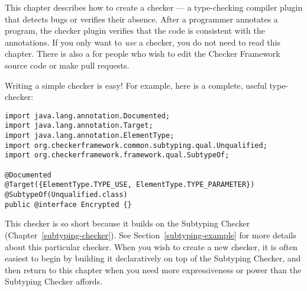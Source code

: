 \htmlhr
{}
\label{writing-a-checker} %

\newcommand{\TreeAPIBase}{https://docs.oracle.com/en/java/javase/11/docs/api/jdk.compiler/com/sun/source}
\newcommand{\refTreeclass}[2]{\href{\TreeAPIBase{}/#1/#2.html?is-external=true}{\<#2>}}
\newcommand{\ModelAPIBase}{https://docs.oracle.com/en/java/javase/11/docs/api/java.compiler/javax/lang/model}
\newcommand{\refModelclass}[2]{\href{\ModelAPIBase{}/#1/#2.html?is-external=true}{\<#2>}}

This chapter describes how to create a checker
--- a type-checking compiler plugin that detects bugs or verifies their
absence.  After a programmer annotates a program,
the checker plugin verifies that the code is consistent
with the annotations.
If you only want to \emph{use} a checker, you do not need to read this
chapter.
There is also a
 for people who wish to edit the Checker Framework source code or
make pull requests.


Writing a simple checker is easy!  For example, here is a complete, useful
type-checker:

\begin{Verbatim}
import java.lang.annotation.Documented;
import java.lang.annotation.Target;
import java.lang.annotation.ElementType;
import org.checkerframework.common.subtyping.qual.Unqualified;
import org.checkerframework.framework.qual.SubtypeOf;

@Documented
@Target({ElementType.TYPE_USE, ElementType.TYPE_PARAMETER})
@SubtypeOf(Unqualified.class)
public @interface Encrypted {}
\end{Verbatim}

This checker is so short because it builds on the Subtyping Checker
(Chapter~\ref{subtyping-checker}).
See Section~\ref{subtyping-example} for more details about this particular checker.
When you wish to create a new checker, it is often easiest to begin by
building it declaratively on top of the Subtyping Checker, and then return to
this chapter when you need more expressiveness or power than the Subtyping
Checker affords.

